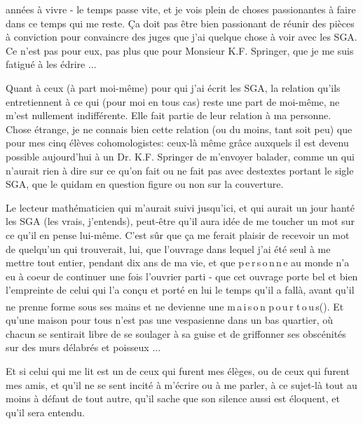 années à vivre - le temps passe vite, et je vois plein de choses passionantes à faire dans ce temps qui me reste. Ça  doit pas être bien passionant de réunir des pièces à conviction pour convaincre des juges que j'ai quelque chose à voir avec les SGA. Ce n'est pas pour eux, pas plus que pour Monsieur K.F. Springer, que je me suis fatigué à les édrire ...

Quant à ceux (à part moi-même) pour qui j'ai écrit les SGA, la relation qu'ils entretiennent à ce qui (pour moi en tous cas) reste une part de moi-même, ne m'est nullement indifférente. Elle fait partie de leur relation à ma personne. Chose étrange, je ne connais bien cette relation (ou du moins, tant soit peu) que pour mes cinq élèves cohomologistes: ceux-là même grâce auxquels il est devenu possible aujourd'hui  à un Dr. K.F. Springer de m'envoyer balader, comme un  qui n'aurait rien à dire sur ce qu'on fait ou ne fait pas avec des\handwritten{\(\vert\)}textes portant le sigle SGA, que le quidam en question figure ou non sur la couverture.

Le lecteur mathématicien qui m'aurait suivi jusqu'ici, et qui aurait un jour hanté les SGA (les vrais, j'entends), peut-être qu'il aura idée de me toucher un mot sur ce qu'il en pense lui-même. C'est sûr que ça me ferait plaisir de recevoir un mot de quelqu'un qui trouverait, lui, que l'ouvrage dans lequel j'ai été seul à me mettre tout entier, pendant dix ans de ma vie, et que \mbox{p\,e\,r\,s\,o\,n\,n\,e} au monde n'a eu à coeur de continuer une fois l'ouvrier parti - que cet ouvrage porte bel et bien l'empreinte de celui qui l'a conçu et porté en lui le temps qu'il a fallà, avant qu'il ne prenne forme sous ses mains et ne devienne une \mbox{m\,a\,i\,s\,o\,n} \mbox{p\,o\,u\,r} \mbox{t\,o\,u\,s}(\textsuperscript{}). Et qu'une maison pour tous n'est pas une vespasienne dans un bas quartier, où chacun se sentirait libre de se soulager à sa guise et de griffonner ses obscénités sur des murs délabrés et poisseux ...

Et si celui qui me lit est un de ceux qui furent mes élèges, ou  de ceux qui furent mes amis, et qu'il ne se sent incité à m'écrire ou à me parler, à ce sujet-là tout au moins à défaut de tout autre, qu'il sache que son silence aussi est éloquent, et qu'il sera entendu.
